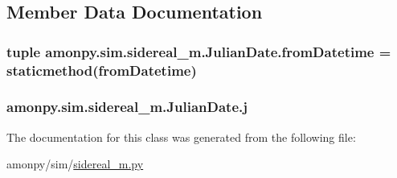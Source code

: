 \subsection{Member Data Documentation}
\hypertarget{classamonpy_1_1sim_1_1sidereal__m_1_1_julian_date_a1e1700d98b10b6aef67f55af0d20d007}{
\subsubsection[{from\-Datetime}]{\setlength{\rightskip}{0pt plus 5cm}tuple amonpy.\-sim.\-sidereal\-\_\-m.\-Julian\-Date.\-from\-Datetime = staticmethod(from\-Datetime)\hspace{0.3cm}{\ttfamily [static]}}}\label{classamonpy_1_1sim_1_1sidereal__m_1_1_julian_date_a1e1700d98b10b6aef67f55af0d20d007}
\hypertarget{classamonpy_1_1sim_1_1sidereal__m_1_1_julian_date_abfaf0b8875ebeebf2b55372f0f08ad2c}{
\subsubsection[{j}]{\setlength{\rightskip}{0pt plus 5cm}amonpy.\-sim.\-sidereal\-\_\-m.\-Julian\-Date.\-j}}\label{classamonpy_1_1sim_1_1sidereal__m_1_1_julian_date_abfaf0b8875ebeebf2b55372f0f08ad2c}


The documentation for this class was generated from the following file\-:\begin{DoxyCompactItemize}
\item 
amonpy/sim/\hyperlink{sidereal__m_8py}{sidereal\-\_\-m.\-py}\end{DoxyCompactItemize}
